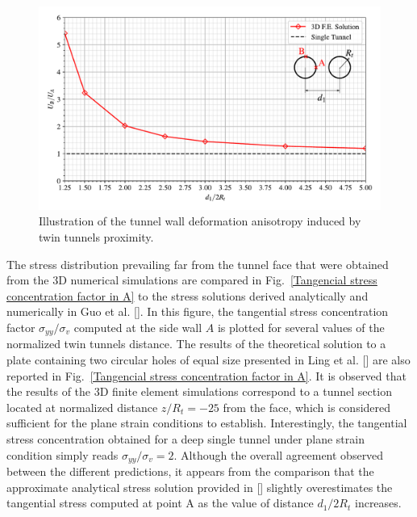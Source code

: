 \documentclass[a4paper,fleqn]{cas-sc}
\begin{document}
\begin{figure}[h!]
	\centering
	\includegraphics[scale=0.65]{Relationship between Convergence in B and A.pdf}
	\caption{Illustration of the tunnel wall deformation anisotropy induced by twin tunnels proximity.}
	\label{Relationship between convergence in B and A}
\end{figure}
\FloatBarrier

The stress distribution prevailing far from the tunnel face that were obtained from the 3D numerical simulations are compared in Fig.~\ref{Tangencial stress concentration factor in A} to the stress solutions derived analytically and numerically in Guo et al. []. In this figure, the tangential stress concentration factor $\sigma_{yy}/\sigma_v$ computed at the side wall $A$ is plotted for several values of the normalized twin tunnels distance. The results of the theoretical solution to a plate containing two circular holes of equal size presented in Ling et al. [] are also reported in Fig.~\ref{Tangencial stress concentration factor in A}. It is observed that the results of the 3D finite element simulations correspond to a tunnel section located at normalized distance $z/R_t = -25$ from the face, which is considered sufficient for the plane strain conditions to establish. Interestingly, the tangential stress concentration obtained for a deep single tunnel under plane strain condition simply reads $\sigma_{yy}/\sigma_v = 2$. Although the overall agreement observed between the different predictions, it appears from the comparison that the approximate analytical stress solution provided in [] slightly overestimates the tangential stress computed at point A as the value of distance $d_1/2R_t$  increases.
\end{document}
